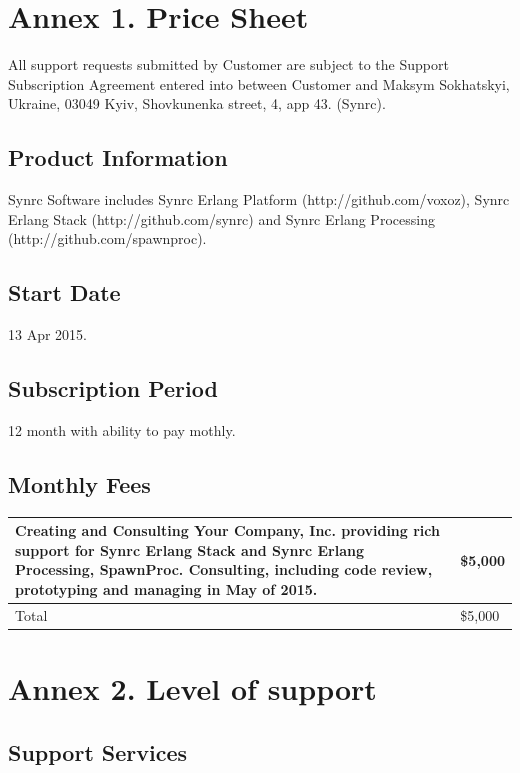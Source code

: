 \documentclass[11pt,oneside]{article}
\begin{document}
\section*{{\bf Annex 1. Price Sheet}}

All support requests submitted by Customer are subject to the Support
Subscription Agreement entered into between Customer and
Maksym Sokhatskyi, Ukraine, 03049 Kyiv, Shovkunenka street, 4, app 43. (Synrc).

\subsection*{Product Information}
Synrc Software includes
Synrc Erlang Platform (http://github.com/voxoz),
Synrc Erlang Stack (http://github.com/synrc) and
Synrc Erlang Processing (http://github.com/spawnproc).

\subsection*{Start Date}
13 Apr 2015.

\subsection*{Subscription Period}
12 month with ability to pay mothly.

\subsection*{Monthly Fees}

\begin{tabular}{ | p{14cm} | l |}
\hline
Creating and Consulting Your Company, Inc.
providing rich support for Synrc Erlang Stack and Synrc Erlang Processing, SpawnProc.
Consulting, including code review, prototyping and managing in May of 2015. & \$5,000 \\
\hline
Total & \$5,000 \\
\hline
\end{tabular}

\newpage

\section*{{\bf Annex 2. Level of support}}

\subsection*{Support Services}
\end{document}
